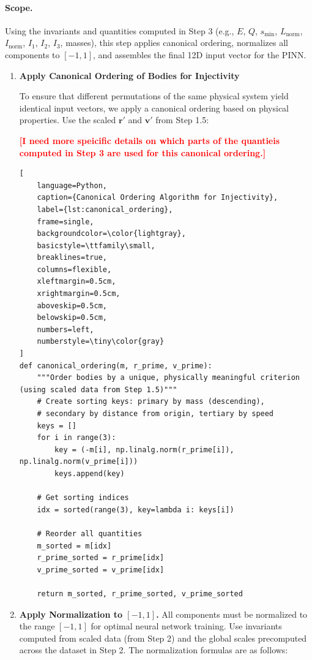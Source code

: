 \documentclass{article}
\newcommand{\authcomment}[1]{\textcolor{Red}{\textbf{[#1]}}}
\begin{document}
\paragraph{Scope.}
Using the invariants and quantities computed in Step 3 
(e.g., $E$, $Q$, $s_{\min}$, $L_{\text{norm}}$, $I_{\text{norm}}$, $I_1$, $I_2$, $I_3$, masses), 
this step applies canonical ordering, normalizes all components to $[-1,1]$, and assembles the final 12D input vector for the PINN.


\begin{enumerate}
    \item \textbf{Apply Canonical Ordering of Bodies for Injectivity}
    
    To ensure that different permutations of the same physical system yield identical input vectors, we apply a canonical ordering based on physical properties. Use the scaled \(\mathbf{r}'\) and \(\mathbf{v}'\) from Step 1.5:

    \authcomment{I need more speicific details on which parts of the quantieis computed in Step 3 are used for this canonical ordering.}

    
\begin{lstlisting}[
    language=Python,
    caption={Canonical Ordering Algorithm for Injectivity},
    label={lst:canonical_ordering},
    frame=single,
    backgroundcolor=\color{lightgray},
    basicstyle=\ttfamily\small,
    breaklines=true,
    columns=flexible,
    xleftmargin=0.5cm,
    xrightmargin=0.5cm,
    aboveskip=0.5cm,
    belowskip=0.5cm,
    numbers=left,
    numberstyle=\tiny\color{gray}
]
def canonical_ordering(m, r_prime, v_prime):
    """Order bodies by a unique, physically meaningful criterion (using scaled data from Step 1.5)"""
    # Create sorting keys: primary by mass (descending), 
    # secondary by distance from origin, tertiary by speed
    keys = []
    for i in range(3):
        key = (-m[i], np.linalg.norm(r_prime[i]), np.linalg.norm(v_prime[i]))
        keys.append(key)
    
    # Get sorting indices
    idx = sorted(range(3), key=lambda i: keys[i])
    
    # Reorder all quantities
    m_sorted = m[idx]
    r_prime_sorted = r_prime[idx]
    v_prime_sorted = v_prime[idx]
    
    return m_sorted, r_prime_sorted, v_prime_sorted
\end{lstlisting}



    \item \textbf{Apply Normalization to $[-1,1]$.}
    All components must be normalized to the range $[-1,1]$ for optimal neural network training. Use invariants computed from scaled data (from Step 2) and the global scales precomputed across the dataset in Step 2. The normalization formulas are as follows:


\end{enumerate}
\end{document}
